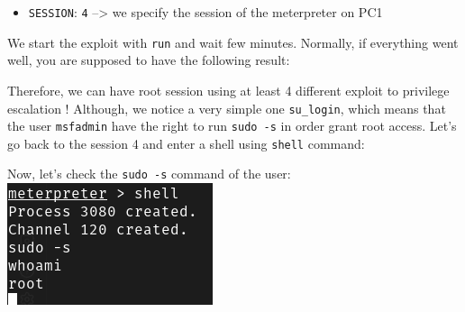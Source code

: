 \documentclass[a4paper,11pt,singlespacing]{article}
\newenvironment{Shaded}{}{}
\newcommand{\NormalTok}[1]{#1}
\providecommand{\tightlist}{%
  \setlength{\itemsep}{0pt}\setlength{\parskip}{0pt}}
\begin{document}
\begin{itemize}
\tightlist
\item
  \texttt{SESSION}: \texttt{4} --\textgreater{} we specify the session
  of the meterpreter on PC1
\end{itemize}

\newpage 

We start the exploit with \texttt{run} and wait few minutes. Normally,
if everything went well, you are supposed to have the following result:

\begin{Shaded}
\end{Shaded}

Therefore, we can have root session using at least 4 different exploit
to privilege escalation ! Although, we notice a very simple one
\texttt{su\_login}, which means that the user \texttt{msfadmin} have the
right to run \texttt{sudo\ -s} in order grant root access. Let's go back
to the session 4 and enter a shell using \texttt{shell} command:

Now, let's check the \texttt{sudo\ -s} command of the user:
\includegraphics{./Images/Image05.png}
\end{document}
